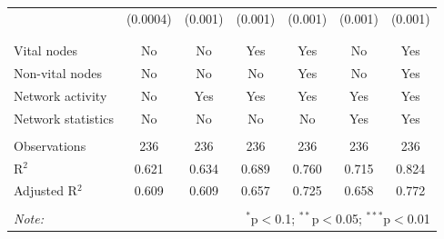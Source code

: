 \begin{table}[!htbp]
\begin{tabular}{@{\extracolsep{5pt}}lcccccc}
  & (0.0004) & (0.001) & (0.001) & (0.001) & (0.001) & (0.001) \\ 
  & & & & & & \\ 
\hline \\[-1.8ex] 
Vital nodes & No & No & Yes & Yes & No & Yes \\ 
Non-vital nodes & No & No & No & Yes & No & Yes \\ 
Network activity & No & Yes & Yes & Yes & Yes & Yes \\ 
Network statistics & No & No & No & No & Yes & Yes \\ 
\hline &  &  &  &  &  &  \\ 
Observations & 236 & 236 & 236 & 236 & 236 & 236 \\ 
R$^{2}$ & 0.621 & 0.634 & 0.689 & 0.760 & 0.715 & 0.824 \\ 
Adjusted R$^{2}$ & 0.609 & 0.609 & 0.657 & 0.725 & 0.658 & 0.772 \\ 
\hline 
\hline \\[-1.8ex] 
\textit{Note:}  & \multicolumn{6}{r}{$^{*}$p$<$0.1; $^{**}$p$<$0.05; $^{***}$p$<$0.01} \\ 
\end{tabular} 
\end{table} 

